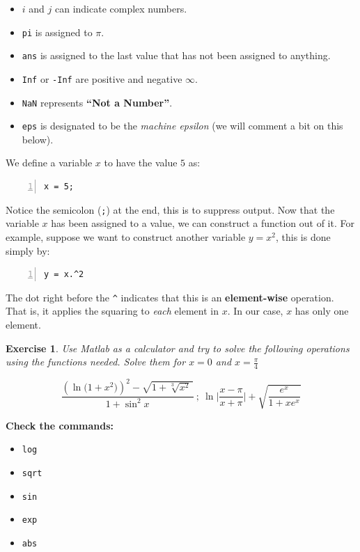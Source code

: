 \documentclass[a4paper,11pt]{article}
\newtheorem{exercise}{Exercise}
\begin{document}
\begin{itemize}
	\item $i$ and $j$ can indicate complex numbers.
	\item \verb;pi; is assigned to $\pi$.
	\item \verb;ans; is assigned to the last value that has not been assigned to anything.
	\item \verb;Inf; or \verb;-Inf; are positive and negative $\infty$.
	\item \verb;NaN; represents \textbf{``Not a Number''}.
	\item \verb;eps; is designated to be the \textit{machine epsilon} (we will comment a bit on this below).
\end{itemize}

We define a variable $x$ to have the value $5$ as:

\begin{Verbatim}[numbers=left, fontsize = \small]
x = 5;
\end{Verbatim}

Notice the semicolon (\verb+;+) at the end, this is to suppress output. Now that the variable $x$ has been assigned to a value, we can construct a function out of it. For example, suppose we want to construct another variable $y = x^2$, this is done simply by:

\begin{Verbatim}[numbers=left, fontsize = \small]
y = x.^2
\end{Verbatim}

The dot right before the \verb+^+ indicates that this is an \textbf{element-wise} operation. That is, it applies the squaring to \textit{each} element in $x$. In our case, $x$ has only one element.

\begin{exercise} 
Use Matlab as a calculator and try to solve the following operations using the functions needed. Solve them for $x = 0$ and $x = \frac{\pi}{4}$

\[
		\frac{\left(\ln\big( 1+x^2\big)\right)^2 - \sqrt{1+\sqrt[3]{x^2}\,}}{1+\sin^2 x} \ ; \  \ln\bigg\lvert\frac{x-\pi}{x+\pi}\bigg\rvert + \sqrt{\frac{e^x}{1+xe^x}}
\]
\end{exercise}

\textbf{Check the commands:}
\begin{itemize}
	\item \verb+log+
	\item \verb+sqrt+
	\item \verb+sin+
	\item \verb+exp+
	\item \verb+abs+
\end{itemize}
\end{document}

